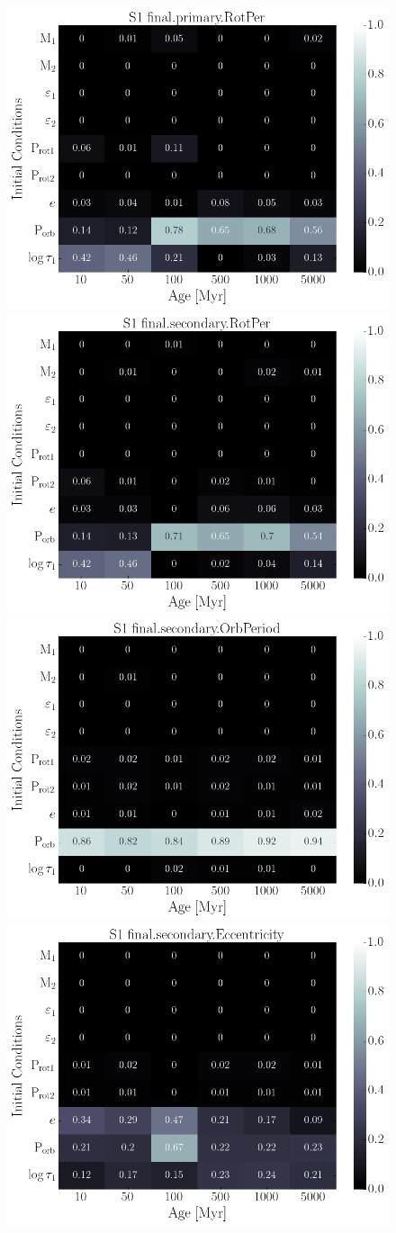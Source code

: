 \documentclass[]{aastex631}
\begin{document}
\begin{figure}[ht!]
\begin{center}
	\includegraphics[width=.49\linewidth]{../figures/sensitivity_final_primary_RotPer.png} 
	\includegraphics[width=.49\linewidth]{../figures/sensitivity_final_secondary_RotPer.png}  \\
	\includegraphics[width=.49\linewidth]{../figures/sensitivity_final_secondary_OrbPeriod.png} 
	\includegraphics[width=.49\linewidth]{../figures/sensitivity_final_secondary_Eccentricity.png} 
\end{center}
\end{figure}
\end{document}
